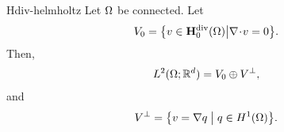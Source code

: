 
\begin{Theorem}{Hdiv-helmholtz}
  Let $\Omega$ be connected. Let
  \begin{gather}
    \label{eq:darcy:1}
    V_0 = \bigl\{ v\in \mathbf H^{\text{div}}_0(\Omega) \big\vert
    \nabla\!\cdot\! v = 0 \bigr\}.
  \end{gather}
  Then,
  \begin{gather}
    L^2(\Omega;\mathbb R^d) = V_0 \oplus {V}^\perp,
  \end{gather}
  and
  \begin{gather}
    {V}^\perp = \bigl\{ v = \nabla q \;\big\vert\;
    q\in H^1(\Omega) \bigr\}.
  \end{gather}
\end{Theorem}

